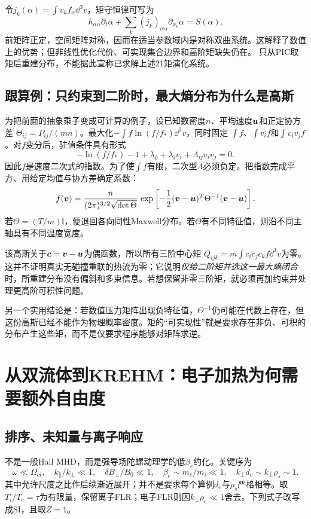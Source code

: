 \documentclass[UTF8,a4paper,11pt,openany,fontset=fandol]{ctexbook}
\begin{document}
令$j_k(\alpha)=\int v_kf_\alpha\dd^3v$，矩守恒律可写为
\begin{equation}
 h_{\alpha\alpha}\partial_t\alpha+
 \sum_k(j_k)_{\alpha\alpha}\partial_{x_k}\alpha=S(\alpha).
\end{equation}
前矩阵正定，空间矩阵对称，因而在适当参数域内是对称双曲系统。这解释了数值上的优势；但非线性优化代价、可实现集合边界和高阶矩缺失仍在。
\citet{E553}只从PIC取矩后重建分布，不能据此宣称已求解上述21矩演化系统。

\subsection{跟算例：只约束到二阶时，最大熵分布为什么是高斯}
为把前面的抽象乘子变成可计算的例子，设已知数密度$n$、平均速度$\bm{u}$和正定协方差
$\Theta_{ij}=P_{ij}/(mn)$。最大化$-\int f\ln(f/f_*)\dd^3v$，同时固定
$\int f$、$\int v_if$和$\int v_iv_jf$。对$f$变分后，驻值条件具有形式
\begin{equation}
 -\ln(f/f_*)-1+\lambda_0+\lambda_iv_i+\Lambda_{ij}v_iv_j=0.
\end{equation}
因此$f$是速度二次式的指数。为了使$\int f$有限，二次型$\Lambda$必须负定。把指数完成平方、用给定均值与协方差确定系数：
\begin{equation}
 f(\bm{v})={n\over(2\pi)^{3/2}\sqrt{\det\Theta}}\,
 \exp\left[-{1\over2}(\bm{v}-\bm{u})^T\Theta^{-1}(\bm{v}-\bm{u})\right].
\end{equation}
若$\Theta=(T/m)\mathsf I$，便退回各向同性Maxwell分布。若$\Theta$有不同特征值，则沿不同主轴具有不同温度宽度。

该高斯关于$\bm{c}=\bm{v}-\bm{u}$为偶函数，所以所有三阶中心矩
$Q_{ijk}=m\int c_ic_jc_kf\dd^3v$为零。这并不证明真实无碰撞重联的热流为零；它说明\emph{仅给二阶矩并选这一最大熵闭合}时，所重建分布没有偏斜和多束信息。若想保留非零三阶矩，就必须再加约束并处理更高阶可积性问题。

另一个实用结论是：若数值压力矩阵出现负特征值，$\Theta^{-1}$仍可能在代数上存在，但这份高斯已经不能作为物理概率密度。矩的“可实现性”就是要求存在非负、可积的分布产生这些矩，而不是仅要求程序能够对矩阵求逆。


\section{从双流体到KREHM：电子加热为何需要额外自由度}
\subsection{排序、未知量与离子响应}
\citet{E512}不是一般Hall MHD，而是强导场陀螺动理学的低$\beta_e$约化。关键序为
\begin{equation}
 \omega\ll\Omega_{ci},\quad k_\parallel/k_\perp\ll1,\quad
 \delta B_\perp/B_0\ll1,\quad \beta_e\sim m_e/m_i\ll1,
 \quad k_\perp d_e\sim k_\perp\rho_s\sim1.
\end{equation}
其中允许尺度之比作后续渐近展开；并不是要求每个算例$d_e$与$\rho_s$严格相等。取$T_i/T_e=\tau$为有限量，保留离子FLR；电子FLR则因$k_\perp\rho_e\ll1$舍去。下列式子改写成SI，且取$Z=1$。
\end{document}
